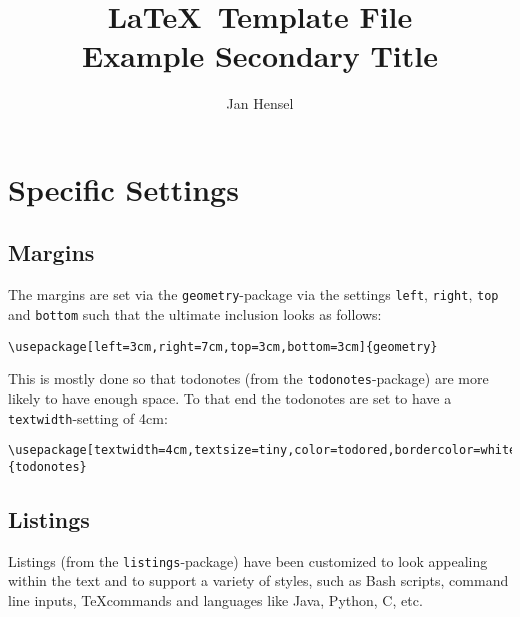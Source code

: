 \documentclass{article}
\author{Jan Hensel}
\title{\textbf{\LaTeX\ Template File}\\
        Example Secondary Title}
\begin{document}
\maketitle

\section{Specific Settings}
    \subsection{Margins}
    The margins are set via the \texttt{geometry}-package via the settings \texttt{left}, 
    \texttt{right}, \texttt{top} and \texttt{bottom} such that the ultimate inclusion 
    looks as follows: 
    \begin{lstlisting}[style=latex]
        \usepackage[left=3cm,right=7cm,top=3cm,bottom=3cm]{geometry}
    \end{lstlisting}
    This is mostly done so that todonotes (from the \texttt{todonotes}-package) are more 
    likely to have enough space. To that end the todonotes are set to have a 
    \texttt{textwidth}-setting of 4cm: 
    \begin{lstlisting}[style=latex]
        \usepackage[textwidth=4cm,textsize=tiny,color=todored,bordercolor=white]{todonotes}
    \end{lstlisting}

    \subsection{Listings}
    Listings (from the \texttt{listings}-package) have been customized to look appealing 
    within the text and to support a variety of styles, such as Bash scripts, command 
    line inputs, \TeX commands and languages like Java, Python, C, etc. 
\end{document}
